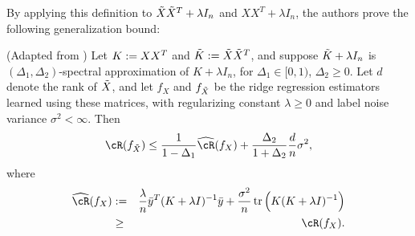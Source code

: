 By applying this definition to $\tX\tX^T + \lambda I_n$ and $XX^T + \lambda I_n$, the authors prove the following generalization bound:
\begin{proposition}{(Adapted from \citep{lprff18})}
	Let $K \defeq XX^T$ and $\tK \defeq \tX\tX^T$, and suppose $\tK + \lambda I_n$ is $(\Delta_1, \Delta_2)$-spectral approximation of $K+\lambda I_n$, for $\Delta_1 \in [0,1)$, $\Delta_2 \geq 0$.
	Let $d$ denote the rank of $\tX$, and let $f_{X}$ and $f_{\tX}$ be the ridge regression estimators learned using these matrices, with regularizing constant $\lambda \geq 0$ and label noise variance $\sigma^2 < \infty$. Then
	\begin{equation}
	\cR(f_{\tX}) \leq \frac{1}{1-\Delta_1} \hcR(f_X) +  \frac{\Delta_2}{1+\Delta_2}\frac{d}{n}\sigma^2,
	\label{eq:risk_bound}
	\end{equation}
	where 
	\begin{eqnarray*}
	\hcR(f_X) &\defeq& \frac{\lambda}{n} \by^T(K+\lambda I)^{-1}\by + \frac{\sigma^2}{n}\tr\Big(K(K+\lambda I)^{-1}\Big) \\
	&\geq& \cR(f_X).
	\end{eqnarray*}
	\label{prop:genbound}
\end{proposition}


